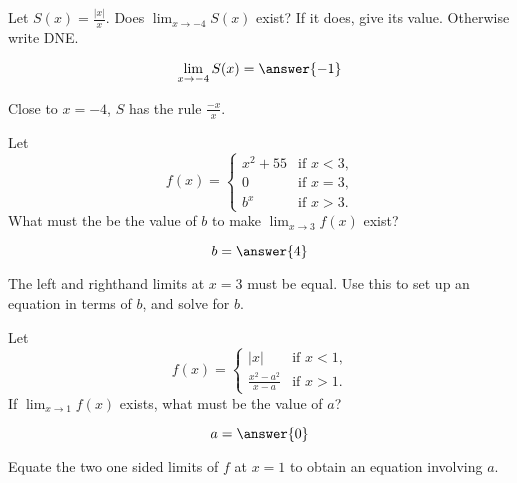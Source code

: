 \documentclass[handout]{ximera}
\begin{document}
\begin{exercise}
Let $S(x) = \frac{|x|}{x}$.  Does $\displaystyle\lim_{x \to -4} S(x)$ exist?  If it
does, give its value.  Otherwise write DNE.

\[
\lim_{x \to -4} S(x) = \answer{-1}
\] 

\begin{hint}
  Close to $x=-4$, $S$ has the rule $\frac{-x}{x}$.
\end{hint}


\end{exercise}

\begin{exercise}
Let
\[
f(x) =
\begin{cases} x^2+55 &\text{if $x<3$,}\\
  0 &\text{if $x=3$,} \\
  b^x &\text{if $x>3$.}
\end{cases}
\]  
What must the be the value of $b$ to make $\displaystyle\lim_{x \to 3} f(x)$ exist?

\[
b = \answer{4}
\]

\begin{hint}
  The left and righthand limits at $x=3$ must be equal.  Use this to
  set up an equation in terms of $b$, and solve for $b$.
\end{hint}
\end{exercise}

\begin{exercise}
Let
\[
f(x) = \begin{cases}
  |x| &\text{if $x<1$,} \\
  \frac{x^2-a^2}{x-a} &\text{if $x>1$.}
\end{cases}
\]
If $\displaystyle\lim_{x \to 1} f(x)$ exists, what must be the value of $a$?

  \[
a = \answer{0}
\]

\begin{hint}
  Equate the two one sided limits of $f$ at $x=1$ to obtain an equation involving $a$.
\end{hint}

\end{exercise}
\end{document}
